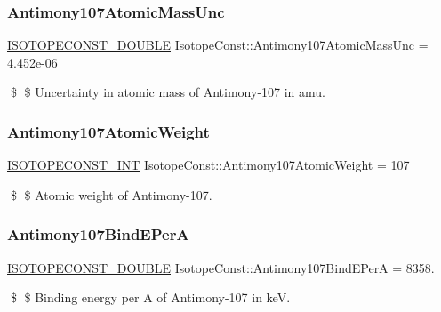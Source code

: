 \subsubsection{\texorpdfstring{Antimony107\+Atomic\+Mass\+Unc}{Antimony107AtomicMassUnc}}
{\footnotesize\ttfamily \mbox{\hyperlink{group___isotope_const-_macros_ga8f45a7272ce02c0b4c65c44636ed719a}{I\+S\+O\+T\+O\+P\+E\+C\+O\+N\+S\+T\+\_\+\+D\+O\+U\+B\+LE}} Isotope\+Const\+::\+Antimony107\+Atomic\+Mass\+Unc = 4.\+452e-\/06}

\$ \$ Uncertainty in atomic mass of Antimony-\/107 in amu. \mbox{\label{group___isotope_const-_antimony-_sb107_ga1121cea08c5a8efefb052973da0c3e77}} 
\subsubsection{\texorpdfstring{Antimony107\+Atomic\+Weight}{Antimony107AtomicWeight}}
{\footnotesize\ttfamily \mbox{\hyperlink{group___isotope_const-_macros_ga5f18360b3e99483a35c32d789e62621c}{I\+S\+O\+T\+O\+P\+E\+C\+O\+N\+S\+T\+\_\+\+I\+NT}} Isotope\+Const\+::\+Antimony107\+Atomic\+Weight = 107}

\$ \$ Atomic weight of Antimony-\/107. \mbox{\label{group___isotope_const-_antimony-_sb107_gaf2343fd07397d5a4c654e89006f15f5a}} 
\subsubsection{\texorpdfstring{Antimony107\+Bind\+E\+PerA}{Antimony107BindEPerA}}
{\footnotesize\ttfamily \mbox{\hyperlink{group___isotope_const-_macros_ga8f45a7272ce02c0b4c65c44636ed719a}{I\+S\+O\+T\+O\+P\+E\+C\+O\+N\+S\+T\+\_\+\+D\+O\+U\+B\+LE}} Isotope\+Const\+::\+Antimony107\+Bind\+E\+PerA = 8358.}

\$ \$ Binding energy per A of Antimony-\/107 in keV. \mbox{\label{group___isotope_const-_antimony-_sb107_gaad001354cb264b2c189d103c9556c99a}} 
